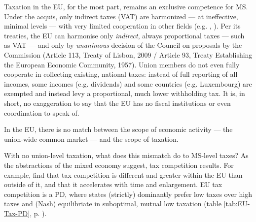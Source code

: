 \documentclass[11pt,a4paper,oneside,openright]{article}
\begin{document}


Taxation in the \gls{EU}, for the most part, remains an exclusive competence for \gls{MS}. Under the acquis, only indirect taxes (VAT) are harmonized --- at ineffective, minimal levels --- with very limited cooperation in other fields (e.g. \citealt{EuropeanCommission2009}, \citealt{TaxCoordinationandTaxCompetitionintheEuropeanUnion-EvaluatingtheCodeofConductonBusinessTaxation2001}). 
Per its treaties, the \gls{EU} can harmonise only \emph{indirect}, always proportional taxes --- such as \gls{VAT} --- and only by \emph{unanimous} decision of the Council on proposals by the Commission (Article 113, Treaty of Lisbon, 2009 / Article 93, Treaty Establishing the European Economic Community, 1957). 
Union members do not even fully cooperate in collecting existing, national taxes: 
instead of full reporting of all incomes, some incomes (e.g. dividends) and some countries (e.g. Luxembourg) are exempted and instead levy a proportional, much lower withholding tax. 
It is, in short, no exaggeration to say that the \gls{EU} has no fiscal institutions or even coordination to speak of.

In the \gls{EU}, there is no match between the scope of economic activity --- the union-wide common market --- and the scope of taxation. 

With no union-level taxation, what does this mismatch do to 
\gls{MS}-level taxes? 
As the abstractions of the mixed economy suggest, tax competition results. 
For example, \cite{Genschel2009} find that tax competition is different and greater within the \gls{EU} than outside of it, and that it accelerates with time and enlargement. 
\gls{EU} tax competition is a \gls{PD}, where states (strictly) dominantly prefer low taxes over high taxes and (Nash) equilibriate in suboptimal, mutual low taxation (table \ref{tab:EU-Tax-PD}, p. \pageref{tab:EU-Tax-PD}).
\end{document}
